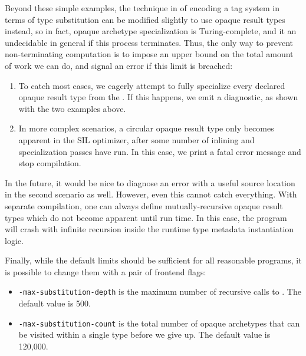 \documentclass[../generics]{subfiles}
\begin{document}
Beyond these simple examples, the technique in  of encoding a tag system in terms of type substitution can be modified slightly to use opaque result types instead, so in fact, opaque archetype specialization is Turing-complete, and it an undecidable in general if this process terminates. Thus, the only way to prevent non-terminating computation is to impose an upper bound on the total amount of work we can do, and signal an error if this limit is breached:
\begin{enumerate}
\item To catch most cases, we eagerly attempt to fully specialize every declared opaque result type from the . If this happens, we emit a diagnostic, as shown with the two examples above.

\item In more complex scenarios, a circular opaque result type only becomes apparent in the SIL optimizer, after some number of inlining and specialization passes have run. In this case, we print a fatal error message and stop compilation.
\end{enumerate}

In the future, it would be nice to diagnose an error with a useful source location in the second scenario as well. However, even this cannot catch everything. With separate compilation, one can always define mutually-recursive opaque result types which do not become apparent until run time. In this case, the program will crash with infinite recursion inside the runtime type metadata instantiation logic.

Finally, while the default limits should be sufficient for all reasonable programs, it is possible to change them with a pair of frontend flags:
\begin{itemize}
\item {}\texttt{-max-substitution-depth} is the maximum number of recursive calls to . The default value is 500.

\item {}\texttt{-max-substitution-count} is the total number of opaque archetypes that can be visited within a single type before we give up. The default value is 120,000.
\end{itemize}
\end{document}
